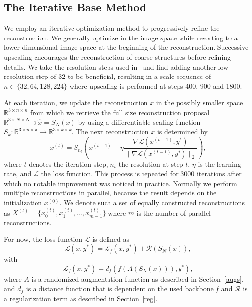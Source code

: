 \documentclass[10pt,twocolumn]{article}
\begin{document}
\subsection{The Iterative Base Method}\label{base_method}
We employ an iterative optimization method to progressively refine the reconstruction.
We generally optimize in the image space while resorting to a lower dimensional image space at the beginning of the reconstruction.
Successive upscaling encourages the reconstruction of coarse structures before refining details.
We take the resolution steps used in~\cite{kazemiWhatWeLearn2024} and find adding another low resolution step of 32 to be beneficial, resulting in a scale sequence of $n\in\{32, 64, 128, 224\}$ where upscaling is performed at steps 400, 900 and 1800.

At each iteration, we update the reconstruction $x$ in the possibly smaller space $\mathbb{R}^{3\times n \times n}$ from which we retrieve the full size reconstruction proposal $\mathbb{R}^{3\times N \times N}\ni\hat{x} = S_N(x)$ by using a differentiable scaling function $S_k:\mathbb{R}^{3\times n \times n}\rightarrow\mathbb{R}^{3\times k \times k}$.
The next reconstruction $x$ is determined by
\begin{equation}\label{eq:update_rule}
x^{(t)} = S_{n_t}\left(x^{(t-1)} - \eta \dfrac{\nabla \mathcal{L}(x^{(t-1)}, y^*)}{\|\nabla \mathcal{L}(x^{(t-1)}, y^*)\|_2}\right),
\end{equation}
where $t$ denotes the iteration step, $n_t$ the resolution at step $t$, $\eta$ is the learning rate, and $\mathcal{L}$ the loss function.
This process is repeated for 3000 iterations after which no notable improvement was noticed in practice.
Normally we perform multiple reconstructions in parallel, because the result depends on the initialization $x^{(0)}$.
We denote such a set of equally constructed reconstructions as $X^{(t)} = \{x^{(t)}_0, x^{(t)}_1, \dots, x^{(t)}_{m-1}\}$ where $m$ is the number of parallel reconstructions.

For now, the loss function $\mathcal{L}$ is defined as
\begin{equation}\label{eq:loss_function_base}
\mathcal{L}(x, y^*) = \mathcal{L}_{f}(x, y^*) + \mathcal{R}(S_N(x)),
\end{equation}
with
\begin{equation}\label{eq:loss_function_f}
    \mathcal{L}_f(x, y^*) = d_{f}(f(A(S_N(x))), y^*),
\end{equation}
where $A$ is a randomized augmentation function as described in Section~\ref{augs}, and $d_f$ is a distance function that is dependent on the used backbone $f$ and $\mathcal{R}$ is a regularization term as described in Section~\ref{reg}.
\end{document}
